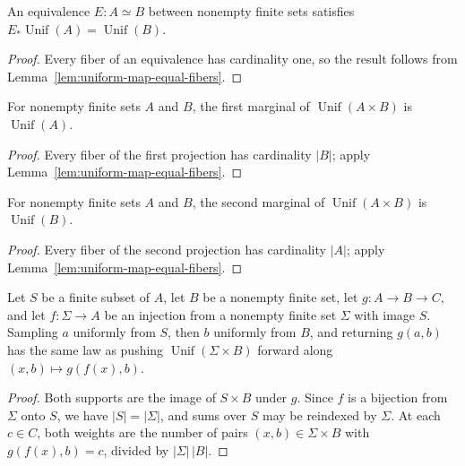 \begin{lemma}\label{lem:uniform-map-equivalence}
	\leanok
	An equivalence $E\colon A\simeq B$ between nonempty finite sets satisfies
	$E_\ast\operatorname{Unif}(A)=\operatorname{Unif}(B)$.
\end{lemma}
\begin{proof}
	\leanok
	Every fiber of an equivalence has cardinality one, so the result follows from
	Lemma~\ref{lem:uniform-map-equal-fibers}.
\end{proof}

\begin{lemma}\label{lem:uniform-product-first-marginal}
	\leanok
	For nonempty finite sets $A$ and $B$, the first marginal of
	$\operatorname{Unif}(A\times B)$ is $\operatorname{Unif}(A)$.
\end{lemma}
\begin{proof}
	\leanok
	Every fiber of the first projection has cardinality $|B|$; apply
	Lemma~\ref{lem:uniform-map-equal-fibers}.
\end{proof}

\begin{lemma}\label{lem:uniform-product-second-marginal}
	\leanok
	For nonempty finite sets $A$ and $B$, the second marginal of
	$\operatorname{Unif}(A\times B)$ is $\operatorname{Unif}(B)$.
\end{lemma}
\begin{proof}
	\leanok
	Every fiber of the second projection has cardinality $|A|$; apply
	Lemma~\ref{lem:uniform-map-equal-fibers}.
\end{proof}

\begin{lemma}
	\label{lem:uniform-bind-on-finset-map}
	\leanok
	Let $S$ be a finite subset of $A$, let $B$ be a nonempty finite set, let
	$g\colon A\to B\to C$, and let $f\colon\Sigma\to A$ be an injection from a
	nonempty finite set $\Sigma$ with image $S$.  Sampling $a$ uniformly from
	$S$, then $b$ uniformly from $B$, and returning $g(a,b)$ has the same law as
	pushing $\operatorname{Unif}(\Sigma\times B)$ forward along
	$(x,b)\mapsto g(f(x),b)$.
\end{lemma}
\begin{proof}
	\leanok
	Both supports are the image of $S\times B$ under $g$.  Since $f$ is a
	bijection from $\Sigma$ onto $S$, we have $|S|=|\Sigma|$, and sums over $S$
	may be reindexed by $\Sigma$.  At each $c\in C$, both weights are the number
	of pairs $(x,b)\in\Sigma\times B$ with $g(f(x),b)=c$, divided by
	$|\Sigma|\,|B|$.
\end{proof}


